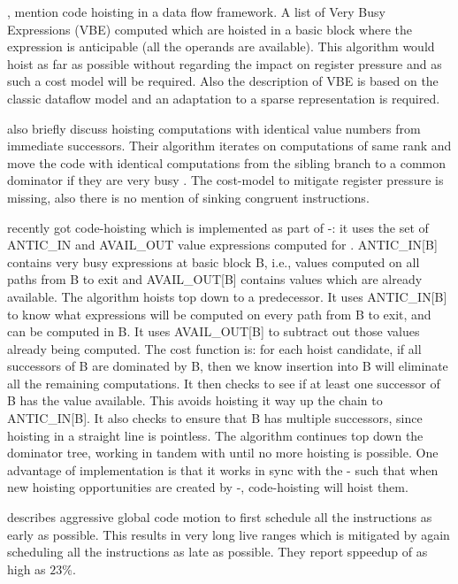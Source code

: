\documentclass[acmlarge,review,anonymous]{acmart}\settopmatter{printfolios=true}
\begin{document}
\citet{dhamdhere1988fast}, \citet{steven1997advanced} mention
code hoisting in a data flow framework. A list of Very Busy Expressions (VBE)
computed which are hoisted in a basic block where the expression is
anticipable (all the operands are available). This algorithm would hoist as far
as possible without regarding the impact on register pressure and as such a cost
model will be required.  Also the description of VBE is based on the classic
dataflow model and an adaptation to a sparse \SSA{} representation is required.

\citet{rosen1988global} also briefly discuss hoisting computations with
identical value numbers from immediate successors. Their algorithm iterates on
computations of same rank and move the code with identical computations from the
sibling branch to a common dominator if they are very busy
\cite{steven1997advanced}. The cost-model to mitigate register pressure is
missing, also there is no mention of sinking congruent instructions.

\GCC{} recently got code-hoisting \cite{GCCCodeHoisting} which is implemented as
part of \GVN{}-\PRE{}: it uses the set of ANTIC\_IN and AVAIL\_OUT value
expressions computed for \PRE{}. ANTIC\_IN[B] contains very busy expressions at
basic block B, i.e., values computed on all paths from B to exit and
AVAIL\_OUT[B] contains values which are already available. The algorithm hoists
top down to a predecessor.  It uses ANTIC\_IN[B] to know what expressions will
be computed on every path from B to exit, and can be computed in B.  It uses
AVAIL\_OUT[B] to subtract out those values already being computed.  The cost
function is: for each hoist candidate, if all successors of B are dominated by
B, then we know insertion into B will eliminate all the remaining computations.
It then checks to see if at least one successor of B has the value available.
This avoids hoisting it way up the chain to ANTIC\_IN[B].  It also checks to
ensure that B has multiple successors, since hoisting in a straight line is
pointless.  The algorithm continues top down the dominator tree, working in
tandem with \PRE{} until no more hoisting is possible.  One advantage of \GCC{}
implementation is that it works in sync with the \GVN{}-\PRE{} such that when
new hoisting opportunities are created by \GVN{}-\PRE{}, code-hoisting will
hoist them.

\citet{click1995global} describes aggressive global code motion to first
schedule all the instructions as early as possible. This results in very long
live ranges which is mitigated by again scheduling all the instructions as late
as possible. They report sppeedup of as high as $23\%$.
\end{document}
